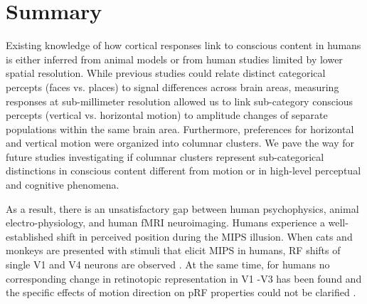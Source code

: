 \chapter{Summary}
Existing knowledge of how cortical responses link to conscious content in humans is either inferred from animal models or from human studies limited by lower spatial resolution. While previous studies could relate distinct categorical percepts (faces vs. places) to signal differences across brain areas, measuring responses at sub-millimeter resolution allowed us to link sub-category conscious percepts (vertical vs. horizontal motion) to amplitude changes of separate populations within the same brain area. Furthermore, preferences for horizontal and vertical motion were organized into columnar clusters. We pave the way for future studies investigating if columnar clusters represent sub-categorical distinctions in conscious content different from motion or in high-level perceptual and cognitive phenomena.

As a result, there is an unsatisfactory gap between human psychophysics, animal electro-physiology, and human fMRI neuroimaging. Humans experience a well-established shift in perceived position during the MIPS illusion. When cats and monkeys are presented with stimuli that elicit MIPS in humans, RF shifts of single V1 and V4 neurons are observed \parencite{Fu2004, Sundberg2006}. At the same time, for humans no corresponding change in retinotopic representation in V1 -V3 has been found \parencite{Liu2006} and the specific effects of motion direction on pRF properties could not be clarified \parencite{Harvey2016}.